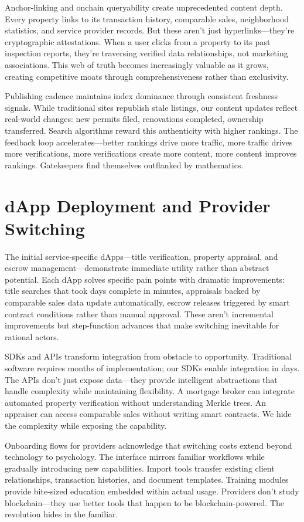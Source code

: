 Anchor-linking and onchain queryability create unprecedented content depth. Every property links to its transaction history, comparable sales, neighborhood statistics, and service provider records. But these aren't just hyperlinks—they're cryptographic attestations. When a user clicks from a property to its past inspection reports, they're traversing verified data relationships, not marketing associations. This web of truth becomes increasingly valuable as it grows, creating competitive moats through comprehensiveness rather than exclusivity.

Publishing cadence maintains index dominance through consistent freshness signals. While traditional sites republish stale listings, our content updates reflect real-world changes: new permits filed, renovations completed, ownership transferred. Search algorithms reward this authenticity with higher rankings. The feedback loop accelerates—better rankings drive more traffic, more traffic drives more verifications, more verifications create more content, more content improves rankings. Gatekeepers find themselves outflanked by mathematics.

\section{dApp Deployment and Provider Switching}

The initial service-specific dApps—title verification, property appraisal, and escrow management—demonstrate immediate utility rather than abstract potential. Each dApp solves specific pain points with dramatic improvements: title searches that took days complete in minutes, appraisals backed by comparable sales data update automatically, escrow releases triggered by smart contract conditions rather than manual approval. These aren't incremental improvements but step-function advances that make switching inevitable for rational actors.

SDKs and APIs transform integration from obstacle to opportunity. Traditional software requires months of implementation; our SDKs enable integration in days. The APIs don't just expose data—they provide intelligent abstractions that handle complexity while maintaining flexibility. A mortgage broker can integrate automated property verification without understanding Merkle trees. An appraiser can access comparable sales without writing smart contracts. We hide the complexity while exposing the capability.

Onboarding flows for providers acknowledge that switching costs extend beyond technology to psychology. The interface mirrors familiar workflows while gradually introducing new capabilities. Import tools transfer existing client relationships, transaction histories, and document templates. Training modules provide bite-sized education embedded within actual usage. Providers don't study blockchain—they use better tools that happen to be blockchain-powered. The revolution hides in the familiar.


